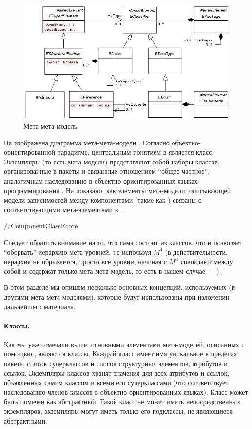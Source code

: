 \begin{figure}[htbp]
\centering
\includegraphics[width=\textwidth]{ecore.png}
\caption{Мета-мета-модель }\label{Ecore}
\end{figure}

На  изображена диаграмма мета-мета-модели . Согласно объектно-ориентированной парадигме, центральным понятием в  является класс. Экземпляры  (то есть мета-модели) представляют собой наборы классов, организованные в пакеты и связанные отношением ``общее-частное'', аналогичным наследованию в объектно-ориентированных языках программирования \cite{OOAD}. На  показано, как элементы мета-модели, описывающей модели зависимостей между компонентами (такие как ) связаны с соответствующими мета-элементами в .

//ComponentClassEcore

Следует обратить внимание на то, что  сама состоит из классов, что и позволяет ``оборвать'' иерархию мета-уровней, не используя $M^4$ (в действительности, иерархия не обрывается, просто все уровни, начиная с $M^3$ совпадают между собой и содержат только мета-мета-модель, то есть в нашем случае --- ).

В этом разделе мы опишем несколько основных концепций, используемых  (и другими мета-мета-моделями), которые будут использованы при изложении дальнейшего материала.

\paragraph*{Классы.} Как мы уже отмечали выше, основными элементами мета-моделей, описанных с помощью , являются классы. Каждый класс имеет имя уникальное в пределах пакета, список суперклассов и список структурных элементов, атрибутов и ссылок. Экземпляры классов хранят значения для всех атрибутов и ссылок, объявленных самим классом и всеми его суперклассами (что соответствует наследованию членов классов в объектно-ориентированных языках). Класс может быть помечен как абстрактный. Такой класс не может иметь непосредственных экземпляров, экземпляры могут иметь только его подклассы, не являющиеся абстрактными.

